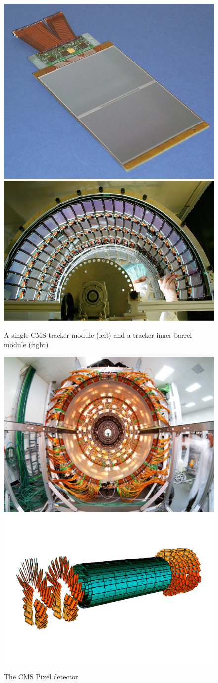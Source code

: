 \begin{figure}
\begin{center}
\includegraphics[width=.45\textwidth]{pics/tracker_module}
\includegraphics[width=.45\textwidth]{pics/tracker_strips}
\end{center}
\caption{A single CMS tracker module (left) and a tracker inner barrel module (right)}
\label{fig:tracker_strips_and_module}
\end{figure}

\begin{figure}
\begin{center}
\includegraphics[width=.45\textwidth]{pics/naked_pixel}
\includegraphics[width=.45\textwidth]{pics/pixel_diagram}
\end{center}
\caption{The CMS Pixel detector }
\label{fig:tracker_solenoid}
\end{figure}

